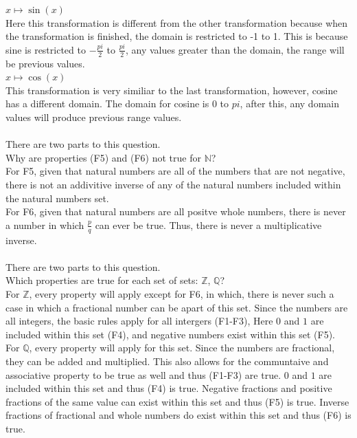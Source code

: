 \documentclass[12pt]{article}
\begin{document}
$x \mapsto \sin(x)$ \\
Here this transformation is different from the other transformation because when the transformation is finished, the domain is restricted to -1 to 1. 
This is because sine is restricted to $-\frac{pi}{2}$ to $\frac{pi}{2}$, any values greater than the domain, the range will be previous values. \\

$x \mapsto \cos(x)$ \\
This transformation is very similiar to the last transformation, however, cosine has a different domain. 
The domain for cosine is $0$ to $pi$, after this, any domain values will produce previous range values.\\

\\
There are two parts to this question.\\ 

Why are properties (F5) and (F6) not true for $\mathbb{N}$?\\

For F5, given that natural numbers are all of the numbers that are not negative, there is not an addivitive inverse of any of the natural numbers included within the natural numbers set. \\

For F6, given that natural numbers are all positve whole numbers, there is never a number in which $\frac{p}{q}$ can ever be true. Thus, there is never a multiplicative inverse.\\


\\
There are two parts to this question.\\

Which properties are true for each set of sets: $\mathbb{Z}$, $\mathbb{Q}$?\\

For $\mathbb{Z}$, every property will apply except for F6, in which, there is never such a case in which a fractional number can be apart of this set. 
Since the numbers are all integers, the basic rules apply for all intergers (F1-F3), Here $0$ and $1$ are included within this set (F4), and negative numbers exist within this set (F5).\\

For $\mathbb{Q}$, every property will apply for this set. 
Since the numbers are fractional, they can be added and multiplied. 
This also allows for the communtaive and associative property to be true as well and thus (F1-F3) are true.
$0$ and $1$ are included within this set and thus (F4) is true. 
Negative fractions and positive fractions of the same value can exist within this set and thus (F5) is true.
Inverse fractions of fractional and whole numbers do exist within this set and thus (F6) is true.\\
\end{document}

